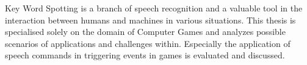 Key Word Spotting is a branch of speech recognition and a valuable tool in the interaction between humans and machines in various situations. 
This thesis is specialised solely on the domain of Computer Games and analyzes possible scenarios of applications and challenges within. 
Especially the application of speech commands in triggering events in games is evaluated and discussed.